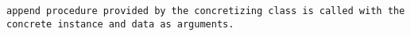 
\tt{append} procedure provided by the concretizing class is
called with the concrete instance and \tt{data} as arguments.
